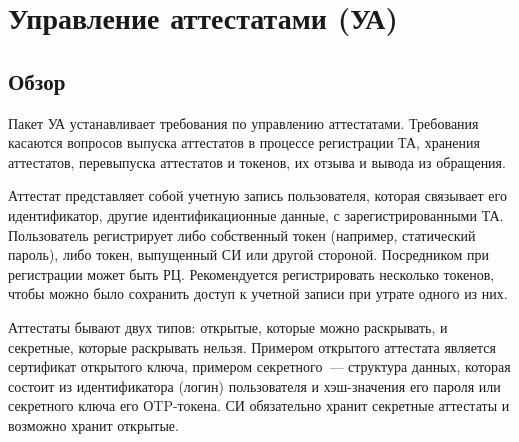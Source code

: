 \section{Управление аттестатами (УА)}\label{CM}

\subsection{Обзор}\label{CM.Intro}

Пакет УА устанавливает требования по управлению аттестатами.
Требования касаются вопросов выпуска аттестатов в процессе регистрации ТА,
хранения аттестатов, перевыпуска аттестатов и токенов, их отзыва и вывода из
обращения.

Аттестат представляет собой учетную запись пользователя, которая связывает
его идентификатор, другие идентификационные данные, с зарегистрированными ТА.
%
Пользователь регистрирует либо собственный токен (например, статический пароль), 
либо токен, выпущенный СИ или другой стороной. 
%
Посредником при регистрации может быть РЦ. Рекомендуется регистрировать 
несколько токенов, чтобы можно было сохранить доступ к учетной записи при 
утрате одного из них.


Аттестаты бывают двух типов: открытые, которые можно раскрывать, и 
секретные, которые раскрывать нельзя. 
%
Примером открытого аттестата является сертификат открытого ключа, примером 
секретного~--- структура данных, которая состоит из идентификатора 
(логин) пользователя и хэш-значения его пароля или секретного ключа его 
ОTP-токена.
%
СИ обязательно хранит секретные аттестаты и возможно хранит открытые.


